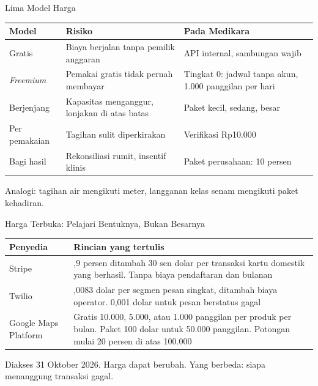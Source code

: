 \documentclass[aspectratio=169, table, 12pt]{beamer}
\begin{document}
\begin{frame}{{\Large Lima Model Harga}}
  \footnotesize
  \begin{tabularx}{\textwidth}{>{\raggedright\arraybackslash}p{2.1cm} >{\raggedright\arraybackslash}X >{\raggedright\arraybackslash}X}
    \hline
    \textbf{Model} & \textbf{Risiko} & \textbf{Pada Medikara} \\ \hline
    Gratis & Biaya berjalan tanpa pemilik anggaran & API internal, sambungan wajib \\ \hline
    \textit{Freemium} & Pemakai gratis tidak pernah membayar & Tingkat 0: jadwal tanpa akun, 1.000 panggilan per hari \\ \hline
    Berjenjang & Kapasitas menganggur, lonjakan di atas batas & Paket kecil, sedang, besar \\ \hline
    Per pemakaian & Tagihan sulit diperkirakan & Verifikasi Rp10.000 \\ \hline
    Bagi hasil & Rekonsiliasi rumit, insentif klinis & Paket perusahaan: 10 persen \\ \hline
  \end{tabularx}

  \vspace{8pt}
  \small Analogi: tagihan air mengikuti meter, langganan kelas senam mengikuti paket kehadiran.
\end{frame}

\begin{frame}{{\Large Harga Terbuka: Pelajari Bentuknya, Bukan Besarnya}}
  \footnotesize
  \begin{tabularx}{\textwidth}{>{\raggedright\arraybackslash}p{2.3cm} >{\raggedright\arraybackslash}X}
    \hline
    \textbf{Penyedia} & \textbf{Rincian yang tertulis} \\ \hline
    Stripe & 2,9 persen ditambah 30 sen dolar per transaksi kartu domestik yang berhasil. Tanpa biaya pendaftaran dan bulanan \\ \hline
    Twilio & 0,0083 dolar per segmen pesan singkat, ditambah biaya operator. 0,001 dolar untuk pesan berstatus gagal \\ \hline
    Google Maps Platform & Gratis 10.000, 5.000, atau 1.000 panggilan per produk per bulan. Paket 100 dolar untuk 50.000 panggilan. Potongan mulai 20 persen di atas 100.000 \\ \hline
  \end{tabularx}

  \vspace{8pt}
  \small Diakses 31 Oktober 2026. Harga dapat berubah. Yang berbeda: siapa menanggung transaksi gagal.
\end{frame}
\end{document}
